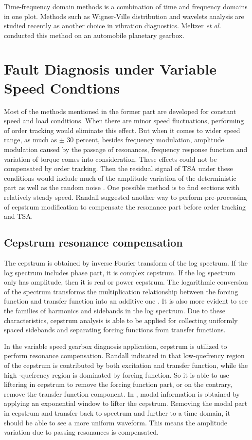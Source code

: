 Time-frequency domain methods is a combination of time and frequency domains in one plot. Methods such as Wigner-Ville distribution and wavelets analysis are studied recently as another choice in vibration diagnostics. Meltzer \textit{et al.} \cite{mel1} \cite{mel2} conducted this method on an automobile planetary gearbox.


\section{Fault Diagnosis under Variable Speed Condtions}

Most of the methods mentioned in the former part are developed for constant speed and load conditions. When there are minor speed fluctuations, performing of order tracking would eliminate this effect. But when it comes to wider speed range, as much as $\pm$ 30 percent, besides frequency modulation, amplitude modulation caused by the passage of resonances, frequency response function and variation of torque comes into consideration. These effects could not be compensated by order tracking. Then the residual signal of TSA under these conditions would include much of the amplitude variation of the deterministic part as well as the random noise \cite{varyspeed}. One possible method is to find sections with relatively steady speed. Randall \cite{varyspeed} suggested another way to perform pre-processing of cepstrum modification to compensate the resonance part before order tracking and TSA.

\subsection{Cepstrum resonance compensation}

The cepstrum is obtained by inverse Fourier transform of the log spectrum. If the log spectrum includes phase part, it is complex cepstrum. If the log spectrum only has amplitude, then it is real or power cepstrum. The logarithmic conversion of the spectrum transforms the multiplication relationship between the forcing function and transfer function into an additive one \cite{vbcm}. It is also more evident to see the families of harmonics and sidebands in the log spectrum. Due to these characteristics, cepstrum analysis is able to be applied for collecting uniformly spaced sidebands and separating forcing functions from transfer functions.

In the variable speed gearbox diagnosis application, cepstrum is utilized to perform resonance compensation. Randall indicated in \cite{resonance} that low-quefrency region of the cepstrum is contributed by both excitation and transfer function, while the high -quefrency region is dominated by forcing function. So it is able to use liftering in cepstrum to remove the forcing function part, or on the contrary, remove the transfer function component. In \cite{varyspeed}, modal information is obtained by applying an exponential window to lifter the cepstrum. Removing the modal part in cepstrum and transfer back to spectrum and further to a time domain, it should be able to see a more uniform waveform. This means the amplitude variation due to passing resonances is compensated.

